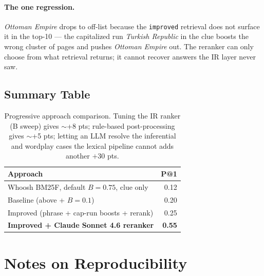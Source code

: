 \documentclass[11pt]{article}
\begin{document}
\paragraph{The one regression.} \emph{Ottoman Empire} drops to
off-list because the \texttt{improved} retrieval does not surface it
in the top-10 --- the capitalized run \emph{Turkish Republic} in the
clue boosts the wrong cluster of pages and pushes \emph{Ottoman Empire}
out. The reranker can only choose from what retrieval returns; it
cannot recover answers the IR layer never saw.

\subsection{Summary Table}

\begin{table}[h]
\centering
\begin{tabular}{lr}
\toprule
\textbf{Approach} & \textbf{P@1} \\
\midrule
Whoosh BM25F, default $B=0.75$, clue only      & 0.12 \\
Baseline (above + $B=0.1$)                     & 0.20 \\
Improved (phrase + cap-run boosts + rerank)    & 0.25 \\
\textbf{Improved + Claude Sonnet 4.6 reranker} & \textbf{0.55} \\
\bottomrule
\end{tabular}
\caption{Progressive approach comparison. Tuning the IR ranker (B sweep)
gives $\sim$+8 pts; rule-based post-processing gives $\sim$+5 pts;
letting an LLM resolve the inferential and wordplay cases the lexical
pipeline cannot adds another $+30$ pts.}
\end{table}

\section{Notes on Reproducibility}
\end{document}
